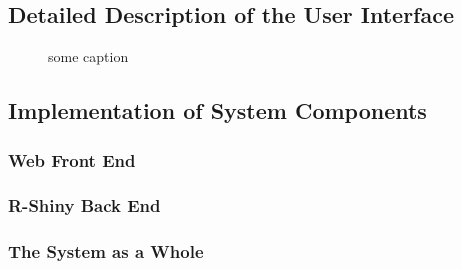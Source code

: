 \subsection{Detailed Description of the User Interface}

\begin{figure}[ht!]
	\begin{center}
	\end{center}
	\caption{{\color{red} some caption}}
\end{figure}



\subsection{Implementation of System Components}
\subsubsection{Web Front End}
\subsubsection{R-Shiny Back End}
\subsubsection{The System as a Whole}

